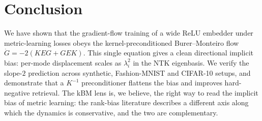 \documentclass[11pt]{article}
\theoremstyle{definition}
\theoremstyle{plain}
\begin{document}
\section{Conclusion}
\label{sec:conclusion}

We have shown that the gradient-flow training of a wide ReLU embedder under
metric-learning losses obeys the kernel-preconditioned Burer--Monteiro flow
$\dot G=-2(KEG+GEK)$. This single equation gives a clean directional
implicit bias: per-mode displacement scales as $\lambda_i^2$ in the NTK
eigenbasis. We verify the slope-$2$ prediction across synthetic, Fashion-MNIST
and CIFAR-10 setups, and demonstrate that a $K^{-1}$ preconditioner flattens
the bias and improves hard-negative retrieval. The kBM lens is, we believe,
the right way to read the implicit bias of metric learning: the rank-bias
literature describes a different axis along which the dynamics is
conservative, and the two are complementary.
\end{document}
